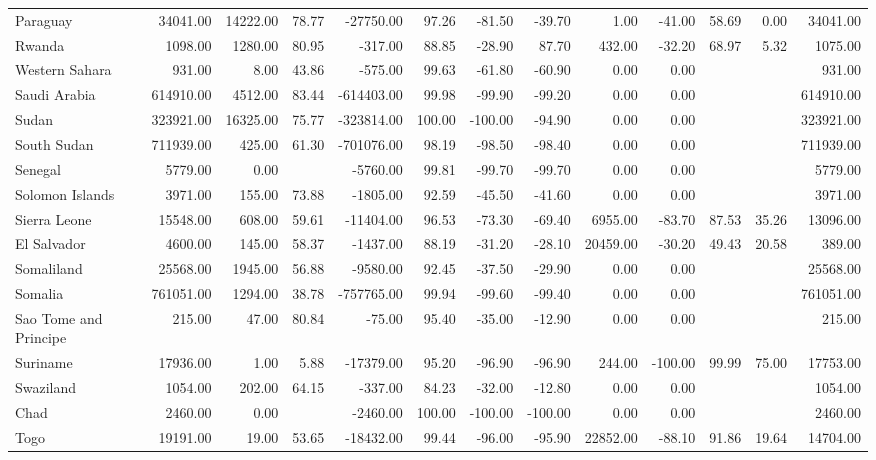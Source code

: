 \begin{table}[ht]
\begin{tabular}{lrrrrrrrrrrrr}
  Paraguay & 34041.00 & 14222.00 & 78.77 & -27750.00 & 97.26 & -81.50 & -39.70 & 1.00 & -41.00 & 58.69 & 0.00 & 34041.00 \\ 
  Rwanda & 1098.00 & 1280.00 & 80.95 & -317.00 & 88.85 & -28.90 & 87.70 & 432.00 & -32.20 & 68.97 & 5.32 & 1075.00 \\ 
  Western Sahara & 931.00 & 8.00 & 43.86 & -575.00 & 99.63 & -61.80 & -60.90 & 0.00 & 0.00 &  &  & 931.00 \\ 
  Saudi Arabia & 614910.00 & 4512.00 & 83.44 & -614403.00 & 99.98 & -99.90 & -99.20 & 0.00 & 0.00 &  &  & 614910.00 \\ 
  Sudan & 323921.00 & 16325.00 & 75.77 & -323814.00 & 100.00 & -100.00 & -94.90 & 0.00 & 0.00 &  &  & 323921.00 \\ 
  South Sudan & 711939.00 & 425.00 & 61.30 & -701076.00 & 98.19 & -98.50 & -98.40 & 0.00 & 0.00 &  &  & 711939.00 \\ 
  Senegal & 5779.00 & 0.00 &  & -5760.00 & 99.81 & -99.70 & -99.70 & 0.00 & 0.00 &  &  & 5779.00 \\ 
  Solomon Islands & 3971.00 & 155.00 & 73.88 & -1805.00 & 92.59 & -45.50 & -41.60 & 0.00 & 0.00 &  &  & 3971.00 \\ 
  Sierra Leone & 15548.00 & 608.00 & 59.61 & -11404.00 & 96.53 & -73.30 & -69.40 & 6955.00 & -83.70 & 87.53 & 35.26 & 13096.00 \\ 
  El Salvador & 4600.00 & 145.00 & 58.37 & -1437.00 & 88.19 & -31.20 & -28.10 & 20459.00 & -30.20 & 49.43 & 20.58 & 389.00 \\ 
  Somaliland & 25568.00 & 1945.00 & 56.88 & -9580.00 & 92.45 & -37.50 & -29.90 & 0.00 & 0.00 &  &  & 25568.00 \\ 
  Somalia & 761051.00 & 1294.00 & 38.78 & -757765.00 & 99.94 & -99.60 & -99.40 & 0.00 & 0.00 &  &  & 761051.00 \\ 
  Sao Tome and Principe & 215.00 & 47.00 & 80.84 & -75.00 & 95.40 & -35.00 & -12.90 & 0.00 & 0.00 &  &  & 215.00 \\ 
  Suriname & 17936.00 & 1.00 & 5.88 & -17379.00 & 95.20 & -96.90 & -96.90 & 244.00 & -100.00 & 99.99 & 75.00 & 17753.00 \\ 
  Swaziland & 1054.00 & 202.00 & 64.15 & -337.00 & 84.23 & -32.00 & -12.80 & 0.00 & 0.00 &  &  & 1054.00 \\ 
  Chad & 2460.00 & 0.00 &  & -2460.00 & 100.00 & -100.00 & -100.00 & 0.00 & 0.00 &  &  & 2460.00 \\ 
  Togo & 19191.00 & 19.00 & 53.65 & -18432.00 & 99.44 & -96.00 & -95.90 & 22852.00 & -88.10 & 91.86 & 19.64 & 14704.00 \\ 

\end{tabular}
\end{table}
